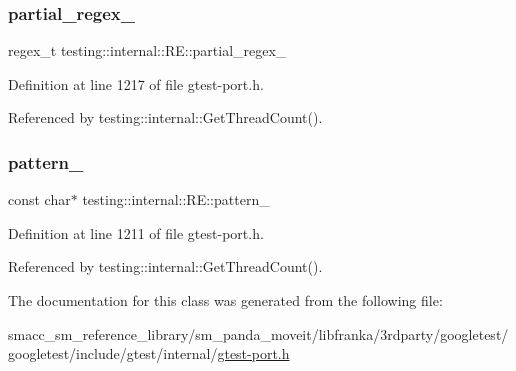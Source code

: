 \subsubsection{\texorpdfstring{partial\+\_\+regex\+\_\+}{partial\_regex\_}}
{\footnotesize\ttfamily regex\+\_\+t testing\+::internal\+::\+R\+E\+::partial\+\_\+regex\+\_\+\hspace{0.3cm}{\ttfamily [private]}}



Definition at line 1217 of file gtest-\/port.\+h.



Referenced by testing\+::internal\+::\+Get\+Thread\+Count().

\mbox{\label{classtesting_1_1internal_1_1RE_a44ab32241fab42db5b6f7482776658ec}} 
\subsubsection{\texorpdfstring{pattern\+\_\+}{pattern\_}}
{\footnotesize\ttfamily const char$\ast$ testing\+::internal\+::\+R\+E\+::pattern\+\_\+\hspace{0.3cm}{\ttfamily [private]}}



Definition at line 1211 of file gtest-\/port.\+h.



Referenced by testing\+::internal\+::\+Get\+Thread\+Count().



The documentation for this class was generated from the following file\+:\begin{DoxyCompactItemize}
\item 
smacc\+\_\+sm\+\_\+reference\+\_\+library/sm\+\_\+panda\+\_\+moveit/libfranka/3rdparty/googletest/googletest/include/gtest/internal/\hyperlink{gtest-port_8h}{gtest-\/port.\+h}\end{DoxyCompactItemize}
